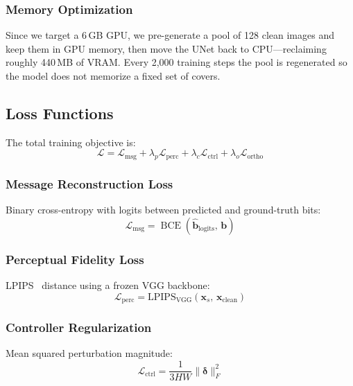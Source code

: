 \documentclass[conference]{IEEEtran}
\newcommand{\Lcal}{\mathcal{L}}
\DeclareMathOperator{\BCE}{BCE}
\begin{document}
\subsubsection{Memory Optimization}
Since we target a 6\,GB GPU, we pre-generate a pool of 128 clean images and keep them in GPU memory, then move the UNet back to CPU---reclaiming roughly 440\,MB of VRAM.
Every 2{,}000 training steps the pool is regenerated so the model does not memorize a fixed set of covers.

\subsection{Loss Functions}
\label{sec:losses}

The total training objective is:
\begin{equation}
    \Lcal = \Lcal_\text{msg} + \lambda_p \Lcal_\text{perc} + \lambda_c \Lcal_\text{ctrl} + \lambda_o \Lcal_\text{ortho}
    \label{eq:total_loss}
\end{equation}

\subsubsection{Message Reconstruction Loss}
Binary cross-entropy with logits between predicted and ground-truth bits:
\begin{equation}
    \Lcal_\text{msg} = \BCE(\hat{\mathbf{b}}_\text{logits},\, \mathbf{b})
    \label{eq:loss_msg}
\end{equation}

\subsubsection{Perceptual Fidelity Loss}
LPIPS~\cite{zhang2018unreasonable} distance using a frozen VGG backbone:
\begin{equation}
    \Lcal_\text{perc} = \text{LPIPS}_\text{VGG}(\mathbf{x}_s,\, \mathbf{x}_\text{clean})
    \label{eq:loss_perc}
\end{equation}

\subsubsection{Controller Regularization}
Mean squared perturbation magnitude:
\begin{equation}
    \Lcal_\text{ctrl} = \frac{1}{3HW} \|\bm{\delta}\|_F^2
    \label{eq:loss_ctrl}
\end{equation}
\end{document}
